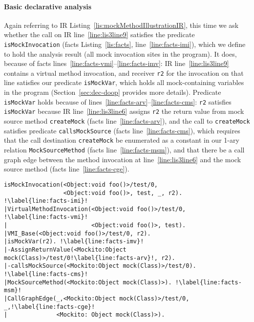 \paragraph{Basic declarative analysis} Again referring to IR Listing~\ref{lis:mockMethodIllustrationIR}, this time we ask whether the call on IR line~\ref{line:lis3line9} satisfies the predicate \texttt{isMockInvocation} (facts Listing~\ref{lis:facts}, line~\ref{line:facts-imi}), which we define to hold the analysis result (all mock invocation sites in the program). It does, because of facts lines~\ref{line:facts-vmi}--\ref{line:facts-imv}: IR line~\ref{line:lis3line9} contains a virtual method invocation, and receiver \texttt{r2} for the invocation on that line satisfies our predicate \texttt{isMockVar}, which holds all mock-containing variables in the program (Section~\ref{sec:dec-doop} provides more details). Predicate \texttt{isMockVar} holds because of lines~\ref{line:facts-arv}--\ref{line:facts-cms}: \texttt{r2} satisfies \texttt{isMockVar} because IR line~\ref{line:lis3line6} assigns \texttt{r2} the return value from mock source method \texttt{createMock} (facts line~\ref{line:facts-arv}), and the call to \texttt{createMock} satisfies predicate \texttt{callsMockSource} (facts line~\ref{line:facts-cms}), which requires that the call destination \texttt{createMock} be enumerated as a constant in our 1-ary relation \texttt{MockSourceMethod} (facts line~\ref{line:facts-msm}), and that there be a call graph edge between the method invocation at line~\ref{line:lis3line6} and the mock source method (facts line~\ref{line:facts-cge}).


\begin{lstlisting}[basicstyle=\ttfamily, caption={Facts about invocation \texttt{r2.foo()} in method \texttt{test}.},
basicstyle=\scriptsize\ttfamily, framesep=4.5mm, framexleftmargin=1.0mm, captionpos=b, label=lis:facts, escapechar=!, morekeywords={@Test}]
isMockInvocation(<Object:void foo()>/test/0, 
                 <Object:void foo()>, test, _, r2). !\label{line:facts-imi}!
|VirtualMethodInvocation(<Object:void foo()>/test/0, !\label{line:facts-vmi}!
|                        <Object:void foo()>, test).
|VMI_Base(<Object:void foo()>/test/0, r2).
|isMockVar(r2). !\label{line:facts-imv}!
|-AssignReturnValue(<Mockito:Object mock(Class)>/test/0!\label{line:facts-arv}!, r2).
|-callsMockSource(<Mockito:Object mock(Class)>/test/0). !\label{line:facts-cms}!
|MockSourceMethod(<Mockito:Object mock(Class)>). !\label{line:facts-msm}!
|CallGraphEdge(_,<Mockito:Object mock(Class)>/test/0, _,!\label{line:facts-cge}!
|              <Mockito: Object mock(Class)>). 
\end{lstlisting}


